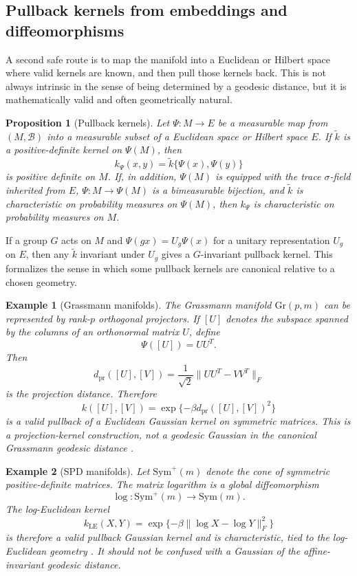 \documentclass[11pt]{article}
\newtheorem{proposition}[theorem]{Proposition}
\newtheorem{example}{Example}[section]
\newcommand{\1}{\mathbf{1}}
\begin{document}
\subsection{Pullback kernels from embeddings and diffeomorphisms}

A second safe route is to map the manifold into a Euclidean or Hilbert space where valid kernels are known, and then pull those kernels back. This is not always intrinsic in the sense of being determined by a geodesic distance, but it is mathematically valid and often geometrically natural.

\begin{proposition}[Pullback kernels]
\label{prop:pullback}
Let $\Psi:M\to E$ be a measurable map from $(M,\mathscr B)$ into a measurable subset of a Euclidean space or Hilbert space $E$. If $\widetilde k$ is a positive-definite kernel on $\Psi(M)$, then
\[
k_\Psi(x,y)=\widetilde k\{\Psi(x),\Psi(y)\}
\]
is positive definite on $M$. If, in addition, $\Psi(M)$ is equipped with the trace $\sigma$-field inherited from $E$, $\Psi:M\to\Psi(M)$ is a bimeasurable bijection, and $\widetilde k$ is characteristic on probability measures on $\Psi(M)$, then $k_\Psi$ is characteristic on probability measures on $M$.
\end{proposition}

If a group $G$ acts on $M$ and $\Psi(gx)=U_g\Psi(x)$ for a unitary representation $U_g$ on $E$, then any $\widetilde k$ invariant under $U_g$ gives a $G$-invariant pullback kernel. This formalizes the sense in which some pullback kernels are canonical relative to a chosen geometry.

\begin{example}[Grassmann manifolds]
The Grassmann manifold $\mathrm{Gr}(p,m)$ can be represented by rank-$p$ orthogonal projectors. If $[U]$ denotes the subspace spanned by the columns of an orthonormal matrix $U$, define
\[
\Psi([U])=UU^T.
\]
Then
\[
d_{\mathrm{pr}}([U],[V])=\frac{1}{\sqrt2}\|UU^T-VV^T\|_F
\]
is the projection distance. Therefore
\[
k([U],[V])=\exp\{-\beta d_{\mathrm{pr}}([U],[V])^2\}
\]
is a valid pullback of a Euclidean Gaussian kernel on symmetric matrices. This is a projection-kernel construction, not a geodesic Gaussian in the canonical Grassmann geodesic distance \citep{harandi_2014_ManifoldManifoldGeometryAware, lim_2021_GrassmannianAffineSubspaces}.
\end{example}

\begin{example}[SPD manifolds]
Let $\mathrm{Sym}^+(m)$ denote the cone of symmetric positive-definite matrices. The matrix logarithm is a global diffeomorphism
\[
\log:\mathrm{Sym}^+(m)\to\mathrm{Sym}(m).
\]
The log-Euclidean kernel
\[
k_{\mathrm{LE}}(X,Y)=\exp\{-\beta\|\log X-\log Y\|_F^2\}
\]
is therefore a valid pullback Gaussian kernel and is characteristic, tied to the log-Euclidean geometry \citep{arsigny_2007_GeometricMeansNovel}. It should not be confused with a Gaussian of the affine-invariant geodesic distance.
\end{example}
\end{document}
